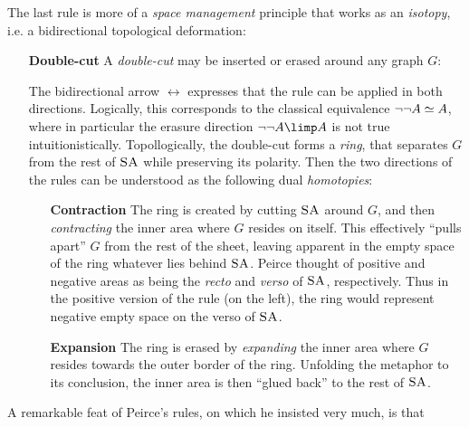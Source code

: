 The last rule is more of a \emph{space management} principle that works as an
\emph{isotopy}, i.e. a bidirectional topological deformation:
\begin{itemize}
  \item[\textbf{Double-cut}]
    A \emph{double-cut} may be inserted or erased around any graph $G$:
    The bidirectional arrow $\leftrightarrow$ expresses that the rule can be
    applied in both directions.
    Logically, this corresponds to the classical equivalence $\neg\neg A
    \simeq A$, where in particular the erasure direction $\neg\neg A \limp A$
    is not true intuitionistically. Topollogically, the double-cut forms a
    \emph{ring}, that separates $G$ from the rest of $\textsc{SA}$ while preserving its
    polarity. Then the two directions of the rules can be understood as the
    following dual \emph{homotopies}:
    \begin{itemize}
      \item[\textbf{Contraction}] The ring is created by cutting $\textsc{SA}$ around
      $G$, and then \emph{contracting} the inner area where $G$ resides on
      itself. This effectively ``pulls apart'' $G$ from the rest of the sheet,
      leaving apparent in the empty space of the ring whatever lies behind
      $\textsc{SA}$. Peirce thought of positive and negative areas as being the
      \emph{recto} and \emph{verso} of $\textsc{SA}$, respectively. Thus in the positive
      version of the rule (on the left), the ring would represent negative empty
      space on the verso of $\textsc{SA}$.
      \item[\textbf{Expansion}] The ring is erased by \emph{expanding} the inner
      area where $G$ resides towards the outer border of the ring. Unfolding the
      metaphor to its conclusion, the inner area is then ``glued back'' to the
      rest of $\textsc{SA}$.
    \end{itemize}
\end{itemize}
A remarkable feat of Peirce's rules, on which he insisted very much, is that
